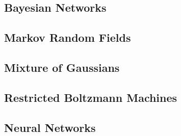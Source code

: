 \documentclass{article}
\begin{document}
\subsection{Bayesian Networks}


\subsection{Markov Random Fields}

\subsection{Mixture of Gaussians}

\subsection{Restricted Boltzmann Machines}

\subsection{Neural Networks}
\end{document}
